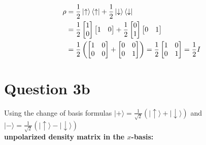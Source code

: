 \documentclass{article}
\begin{document}
\begin{align*}
\rho &= \frac{1}{2} \ket{\uparrow}\bra{\uparrow} + \frac{1}{2} \ket{\downarrow}\bra{\downarrow} \\
&= \frac{1}{2} \begin{bmatrix} 1 \\ 0 \end{bmatrix} \begin{bmatrix} 1 & 0 \end{bmatrix} + \frac{1}{2} \begin{bmatrix} 0 \\ 1 \end{bmatrix} \begin{bmatrix} 0 & 1 \end{bmatrix} \\
&= \frac{1}{2} \left( \begin{bmatrix} 1 & 0 \\ 0 & 0 \end{bmatrix} + \begin{bmatrix} 0 & 0 \\ 0 & 1 \end{bmatrix} \right) = \frac{1}{2} \begin{bmatrix} 1 & 0 \\ 0 & 1 \end{bmatrix} = \frac{1}{2} I
\end{align*}

\section*{Question 3b}
Using the change of basis formulas $|+\rangle = \frac{1}{\sqrt{2}}(|\uparrow\rangle + |\downarrow\rangle)$ and $|-\rangle = \frac{1}{\sqrt{2}}(|\uparrow\rangle - |\downarrow\rangle)$ \\

\textbf{unpolarized density matrix in the $x$-basis:}
\end{document}
